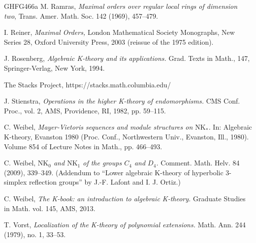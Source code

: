 \documentclass[reqno,11pt,letterpaper]{amsart}
\theoremstyle{plain}
\numberwithin{equation}{subsection}
\theoremstyle{remark}
\theoremstyle{plain}
\theoremstyle{definition}\newtheorem*{notation}{Notation}
\newcommand{\RK}{\mathrm{K}}
\newcommand{\RNK}{\mathrm{NK}}
\begin{document}
\begin{thebibliography}{GHFG466a}
 M. Ramras, \emph{Maximal orders over regular local rings of dimension two}, Trans. Amer. Math. Soc. 142 (1969), 457--479.

 I. Reiner, \emph{Maximal Orders,} London Mathematical Society Monographs, New Series 28, Oxford University Press, 2003 (reissue of the 1975 edition).

 J. Rosenberg, \emph{Algebraic K-theory and its applications.}
Grad. Texts in Math., 147,
Springer-Verlag, New York, 1994. 
 

 The Stacks Project, https://stacks.math.columbia.edu/

 

 J. Stienstra, \emph{Operations in the higher K-theory of endomorphisms.}
CMS Conf. Proc., vol. 2,
AMS, Providence, RI, 1982, pp. 59--115.

 C. Weibel,  \textit{Mayer-Vietoris sequences and module structures on $\RNK_*$.} In: Algebraic K-theory, Evanston 1980 (Proc. Conf., Northwestern Univ., Evanston, Ill., 1980). Volume 854 of Lecture Notes in Math., pp. 466--493. 

 C. Weibel,  \textit{$\RNK_0$ and $\RNK_1$ of the groups $C_4$ and $D_4$.}
Comment. Math. Helv. 84 (2009), 339--349. (Addendum to “Lower algebraic $\RK$-theory of hyperbolic 3-simplex reflection
groups” by J.-F. Lafont and I. J. Ortiz.)

 C. Weibel, \emph{The K-book: an introduction to algebraic K-theory.}
Graduate Studies in Math. vol. 145, AMS, 2013.  


  T. Vorst, \emph{Localization of the  K-theory of polynomial extensions.}
Math. Ann. 244 (1979), no. 1, 33--53.
\end{thebibliography}
\end{document}
